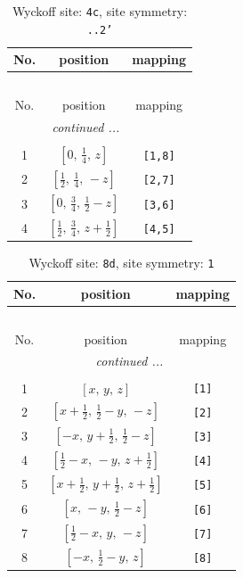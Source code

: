 \documentclass[fleqn,8pt]{jsarticle}
\begin{document}
\renewcommand{\arraystretch}{1.2}
\begin{longtable}{ccc}
\caption{Wyckoff site: {\tt 4c}, site symmetry: {\tt ..2'}}
 \\
 \hline \hline
No. & position & mapping \\ \hline \endfirsthead

\multicolumn{2}{l}{\tablename\ \thetable{}} \\
 \hline \hline
No. & position & mapping \\ \hline \endhead

 \hline \hline
\multicolumn{2}{r}{\footnotesize\it continued ...} \\ \endfoot

 \hline \hline
\multicolumn{2}{r}{} \\ \endlastfoot

1 & $\left[ 0,\, \frac{1}{4},\, z \right]$ & {\tt [1,8]} \\ \hline
2 & $\left[ \frac{1}{2},\, \frac{1}{4},\, - z \right]$ & {\tt [2,7]} \\ \hline
3 & $\left[ 0,\, \frac{3}{4},\, \frac{1}{2} - z \right]$ & {\tt [3,6]} \\ \hline
4 & $\left[ \frac{1}{2},\, \frac{3}{4},\, z + \frac{1}{2} \right]$ & {\tt [4,5]} \\
\end{longtable}
\renewcommand{\arraystretch}{1.2}
\begin{longtable}{ccc}
\caption{Wyckoff site: {\tt 8d}, site symmetry: {\tt 1}}
 \\
 \hline \hline
No. & position & mapping \\ \hline \endfirsthead

\multicolumn{2}{l}{\tablename\ \thetable{}} \\
 \hline \hline
No. & position & mapping \\ \hline \endhead

 \hline \hline
\multicolumn{2}{r}{\footnotesize\it continued ...} \\ \endfoot

 \hline \hline
\multicolumn{2}{r}{} \\ \endlastfoot

1 & $\left[ x,\, y,\, z \right]$ & {\tt [1]} \\ \hline
2 & $\left[ x + \frac{1}{2},\, \frac{1}{2} - y,\, - z \right]$ & {\tt [2]} \\ \hline
3 & $\left[ - x,\, y + \frac{1}{2},\, \frac{1}{2} - z \right]$ & {\tt [3]} \\ \hline
4 & $\left[ \frac{1}{2} - x,\, - y,\, z + \frac{1}{2} \right]$ & {\tt [4]} \\ \hline
5 & $\left[ x + \frac{1}{2},\, y + \frac{1}{2},\, z + \frac{1}{2} \right]$ & {\tt [5]} \\ \hline
6 & $\left[ x,\, - y,\, \frac{1}{2} - z \right]$ & {\tt [6]} \\ \hline
7 & $\left[ \frac{1}{2} - x,\, y,\, - z \right]$ & {\tt [7]} \\ \hline
8 & $\left[ - x,\, \frac{1}{2} - y,\, z \right]$ & {\tt [8]} \\
\end{longtable}
\end{document}
